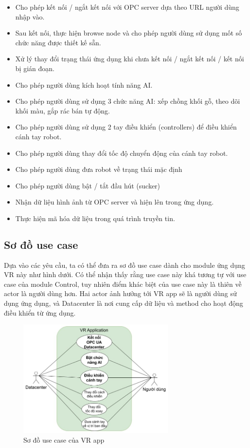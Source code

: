 \begin{itemize}
    \item Cho phép kết nối / ngắt kết nối với OPC server dựa theo URL người dùng nhập vào.
    \item Sau kết nối, thực hiện browse node và cho phép người dùng sử dụng mốt số chức năng được thiết kế sẵn.
    \item Xử lý thay đổi trạng thái ứng dụng khi chưa kết nối / ngắt kết nối / kết nối bị gián đoạn.
    \item Cho phép người dùng kích hoạt tính năng AI.
    \item Cho phép người dùng sử dụng 3 chức năng AI: xếp chồng khối gỗ, theo dõi khối màu, gắp rác bán tự động.
    \item Cho phép người dùng sử dụng 2 tay điều khiển (controllers) để điều khiển cánh tay robot.
    \item Cho phép người dùng thay đổi tốc độ chuyển động của cánh tay robot.
    \item Cho phép người dùng đưa robot về trạng thái mặc định
    \item Cho phép người dùng bật / tắt đầu hút (sucker)
    \item Nhận dữ liệu hình ảnh từ OPC server và hiện lên trong ứng dụng.
    \item Thực hiện mã hóa dữ liệu trong quá trình truyền tin.
\end{itemize}

\subsection{Sơ đồ use case}

Dựa vào các yêu cầu, ta có thể đưa ra sơ đồ use case dành cho module ứng dụng VR này như hình dưới. Có thể nhận thấy rằng use case này khá tương tự với use case của module Control, tuy nhiên điểm khác biệt của use case này là thiên về actor là người dùng hơn. Hai actor ảnh hưởng tới VR app sẽ là người dùng sử dụng ứng dụng, và Datacenter là nơi cung cấp dữ liệu và method cho hoạt động điều khiển từ ứng dụng.

\begin{figure}[H]
    \centering
    \includegraphics[width=0.7\textwidth]{Images/Implementation/VRapp/VR_usecase.jpg}
    \caption{Sơ đồ use case của VR app}
    \label{fig:use_case_vr_app}
\end{figure}

